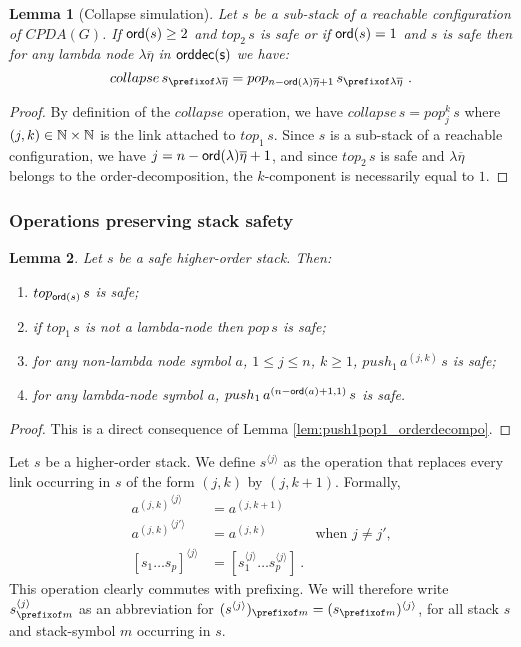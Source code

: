 \documentclass[a4paper]{article}
\newtheorem{lemma}{Lemma}[section]
\theoremstyle{remark}
\theoremstyle{definition}
\newcommand\orddec{\sf orddec}
\begin{document}
\begin{lemma}[Collapse simulation]
\label{lem:safecollapsesimulation}
Let $s$ be a sub-stack of a reachable configuration of $CPDA(G)$.
If ${\sf ord}(s) \geq 2$ and $top_2\,s$ is safe or if ${\sf ord}(s) = 1$ and $s$ is safe then for any lambda node $\lambda\overline\eta$ in $\orddec(s)$ we have:
$$collapse\,s_{\prefixof\lambda\overline\eta} = pop_{n-\ord \lambda\overline\eta +1}\,s_{\prefixof\lambda\overline\eta} \ . $$
\end{lemma}
\begin{proof}
By definition of the $collapse$ operation, we have $collapse\,s = pop_j^k\,s$ where $(j,k)\in\mathbb{N}\times\mathbb{N}$ is the link attached to $top_1\,s$.
Since $s$ is a sub-stack of a reachable configuration, we have $j = n-{\sf ord}(\lambda)\overline\eta +1$, and since
$top_2\,s$ is safe and $\lambda\overline\eta$ belongs to the order-decomposition, the $k$-component is necessarily equal to $1$.
\end{proof}


\subsubsection*{Operations preserving stack safety}
\begin{lemma}
\label{lem:push1pop1_preserves_safety} Let $s$ be a safe higher-order
stack. Then:
\begin{enumerate}
    \item $top_{{\sf ord}(s)}\,s$ is safe;

  \item if $top_1\,s$ is not a lambda-node then $pop\,s$ is safe;
  \item for any non-lambda node symbol $a$, $1 \leq j \leq n$, $k \geq 1$, $push_1\,a^{(j,k)}\,s$ is safe;
  \item for any lambda-node symbol $a$, $push_1\,a^{(n-{\sf ord}(a)+1,1)}\,s$ is safe.
\end{enumerate}
\end{lemma}
\begin{proof}
This is a direct consequence of Lemma
\ref{lem:push1pop1_orderdecompo}.
\end{proof}



Let $s$ be a higher-order stack. We define $s^{\langle j \rangle}$ as the operation that replaces
every link occurring in $s$ of the form $(j,k)$ by $(j,k+1)$. Formally,
\begin{align*}
{a^{(j,k)}}^{\langle j \rangle} &= a^{(j,k+1)}   \\
{a^{(j,k)}}^{\langle j' \rangle} &= a^{(j,k)} &   \mbox{when $j\neq j'$,}\\
[s_1 \ldots s_p]^{\langle j \rangle} &= [s_1^{\langle j \rangle} \ldots s_p^{\langle j \rangle}] \ .
\end{align*}
This operation clearly commutes with prefixing. We will therefore write $s^{\langle j\rangle}_{\prefixof m}$ as an abbreviation for
$(s^{\langle j\rangle})_{\prefixof m} = (s_{\prefixof m})^{\langle j\rangle}$,
for all stack $s$ and stack-symbol $m$ occurring in $s$.
\end{document}
